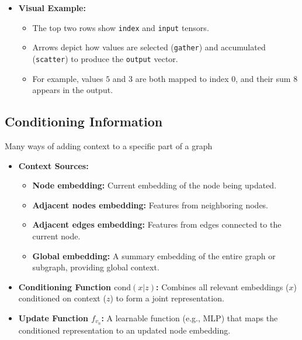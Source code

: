 \begin{notes}
\begin{itemize}
\begin{itemize}
        \end{itemize}
        \item \textbf{Visual Example:}
        \begin{itemize}
            \item The top two rows show \texttt{index} and \texttt{input} tensors.
            \item Arrows depict how values are selected (\texttt{gather}) and accumulated (\texttt{scatter}) to produce the \texttt{output} vector.
            \item For example, values $5$ and $3$ are both mapped to index $0$, and their sum $8$ appears in the output.
        \end{itemize}
    \end{itemize}    
\end{notes}
\newpage

\subsection{Conditioning Information}
\begin{notes}
    Many ways of adding context to a specific part of a graph \\
    \begin{itemize}    
        \item \textbf{Context Sources:}
        \begin{itemize}
            \item \textbf{Node embedding:} Current embedding of the node being updated.
            \item \textbf{Adjacent nodes embedding:} Features from neighboring nodes.
            \item \textbf{Adjacent edges embedding:} Features from edges connected to the current node.
            \item \textbf{Global embedding:} A summary embedding of the entire graph or subgraph, providing global context.
        \end{itemize}
    
        \item \textbf{Conditioning Function \(\text{cond}(x|z)\):} Combines all relevant embeddings (\(x\)) conditioned on context (\(z\)) to form a joint representation.
    
        \item \textbf{Update Function \(f_{v_n}\):} A learnable function (e.g., MLP) that maps the conditioned representation to an updated node embedding.
    \end{itemize}    
\end{notes}


